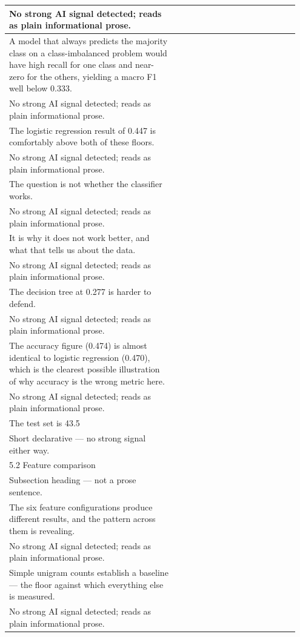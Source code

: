 \documentclass[11pt]{article}
\begin{document}
\begin{longtable}{|p{0.55\linewidth}|p{0.40\linewidth}|}
\hline
No strong AI signal detected; reads as plain informational prose. & \\
\hline
A model that always predicts the majority class on a class-imbalanced problem would have high recall for one class and near-zero for the others, yielding a macro F1 well below 0.333. & \\[2pt]
\hline
No strong AI signal detected; reads as plain informational prose. & \\
\hline
The logistic regression result of 0.447 is comfortably above both of these floors. & \\[2pt]
\hline
No strong AI signal detected; reads as plain informational prose. & \\
\hline
The question is not whether the classifier works. & \\[2pt]
\hline
No strong AI signal detected; reads as plain informational prose. & \\
\hline
It is why it does not work better, and what that tells us about the data. & \\[2pt]
\hline
No strong AI signal detected; reads as plain informational prose. & \\
\hline
The decision tree at 0.277 is harder to defend. & \\[2pt]
\hline
No strong AI signal detected; reads as plain informational prose. & \\
\hline
The accuracy figure (0.474) is almost identical to logistic regression (0.470), which is the clearest possible illustration of why accuracy is the wrong metric here. & \\[2pt]
\hline
No strong AI signal detected; reads as plain informational prose. & \\
\hline
The test set is 43.5 & \\[2pt]
\hline
Short declarative --- no strong signal either way. & \\
\hline
5.2 Feature comparison & \\[2pt]
\hline
Subsection heading --- not a prose sentence. & \\
\hline
The six feature configurations produce different results, and the pattern across them is revealing. & \\[2pt]
\hline
No strong AI signal detected; reads as plain informational prose. & \\
\hline
Simple unigram counts establish a baseline --- the floor against which everything else is measured. & \\[2pt]
\hline
No strong AI signal detected; reads as plain informational prose. & \\

\end{longtable}
\end{document}
